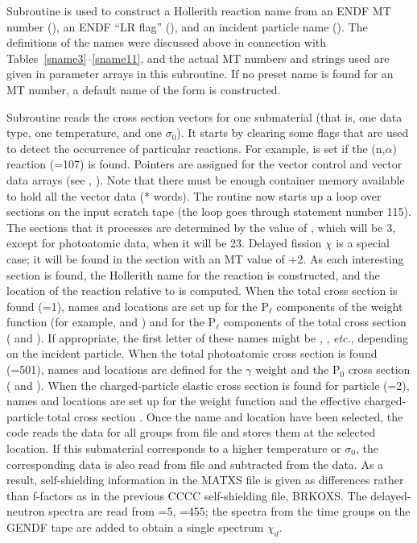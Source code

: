 Subroutine  is used to construct
a Hollerith reaction name  from an ENDF MT number
(), an ENDF ``LR flag'' (), and an incident
particle name ().   The definitions of the names were
discussed above in connection with Tables~\ref{sname3}--\ref{sname11},
and the actual MT numbers and strings used are given in
parameter arrays in this subroutine.  If no preset name is found for an
MT number, a default name of the form  is constructed.

Subroutine  reads the
cross section vectors for one submaterial (that is, one data type,
one temperature, and one $\sigma_0$).  It starts by clearing
some flags that are used to detect the occurrence of particular
reactions.  For example,  is set if the (n,$\alpha$)
reaction (=107) is found.  Pointers are assigned for the
vector control and vector data arrays (see , ).
Note that there must be enough container memory available to hold all
the vector data (* words).  The routine now starts up a
loop over sections on the input scratch tape (the loop goes through
statement number 115).  The sections that it processes are determined
by the value of , which will be 3, except for photoatomic
data, when it will be 23.  Delayed fission $\chi$ is a special case;
it will be found in the section with an MT value of +2.  As
each interesting section is found, the Hollerith name for the reaction
is constructed, and the location of the reaction relative to
 is computed.  When the total cross section is
found (=1),
names and locations are set up for the P$_\ell$ components of the weight
function (for example,  and ) and for the
P$_\ell$ components of the total cross section ( and
).  If appropriate, the first letter of these names might
be , , {\it etc.}, depending on the incident particle.
When the total photoatomic cross section is found (=501), names
and locations are defined for the $\gamma$ weight and the P$_0$ cross
section ( and ).  When the charged-particle
elastic cross section is found for particle  (=2), names and
locations are set up for the weight function  and the
effective charged-particle total cross section .  Once
the name and location have been selected, the code reads the data for
all groups from file  and stores them at the selected
location.  If this submaterial corresponds to a higher temperature
or $\sigma_0$, the corresponding data is also read from file
 and subtracted from the  data.  As a result,
self-shielding information in the MATXS file is given as differences
rather than f-factors as in the previous CCCC self-shielding file,
BRKOXS.  The delayed-neutron spectra are read from
=5, =455; the
spectra from the time groups on the GENDF tape are added to obtain
a single spectrum $\chi_d$.

